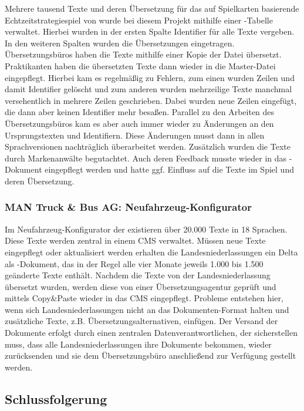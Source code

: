 Mehrere tausend Texte und deren Übersetzung für das auf Spielkarten basierende Echtzeitstrategiespiel  von  wurde bei diesem Projekt mithilfe einer -Tabelle verwaltet. Hierbei wurden in der ersten Spalte Identifier für alle Texte vergeben. In den weiteren Spalten wurden die Übersetzungen eingetragen. Übersetzungsbüros haben die Texte mithilfe einer Kopie der Datei übersetzt. Praktikanten haben die übersetzten Texte dann wieder in die Master-Datei eingepflegt. Hierbei kam es regelmäßig zu Fehlern, zum einen wurden Zeilen und damit Identifier gelöscht und zum anderen wurden mehrzeilige Texte manchmal versehentlich in mehrere Zeilen geschrieben. Dabei wurden neue Zeilen eingefügt, die dann aber keinen Identifier mehr besaßen. Parallel zu den Arbeiten des Übersetzungsbüros kam es aber auch immer wieder zu Änderungen an den Ursprungstexten und Identifiern. Diese Änderungen musst dann in allen Sprachversionen nachträglich überarbeitet werden. Zusätzlich wurden die Texte durch Markenanwälte begutachtet. Auch deren Feedback musste wieder in das -Dokument eingepflegt werden und hatte ggf. Einfluss auf die Texte im Spiel und deren Übersetzung.

\subsubsection{MAN Truck \& Bus AG: Neufahrzeug-Konfigurator}

Im Neufahrzeug-Konfigurator der  existieren über 20.000 Texte in 18 Sprachen. Diese Texte werden zentral in einem CMS verwaltet. Müssen neue Texte eingepflegt oder aktualisiert werden erhalten die Landesniederlassungen ein Delta als -Dokument, das in der Regel alle vier Monate jeweils 1.000 bis 1.500 geänderte Texte enthält. Nachdem die Texte von der Landesniederlassung übersetzt wurden, werden diese von einer Übersetzungsagentur geprüft und mittels Copy\&Paste wieder in das CMS eingepflegt.  Probleme entstehen hier, wenn sich Landesniederlassungen nicht an das Dokumenten-Format halten und zusätzliche Texte, z.B. Übersetzungsalternativen, einfügen. Der Versand der Dokumente erfolgt durch einen zentralen Datenverantwortlichen, der sicherstellen muss, dass alle Landesniederlassungen ihre Dokumente bekommen, wieder zurücksenden und sie dem Übersetzungsbüro anschließend zur Verfügung gestellt werden.

\pagebreak

\subsection{Schlussfolgerung}\label{l:schlussfolgerung}

